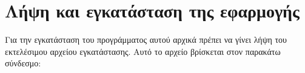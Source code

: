 







\section{Λήψη και εγκατάσταση της εφαρμογής}
Για την εγκατάσταση του προγράμματος αυτού αρχικά πρέπει να γίνει λήψη του εκτελέσιμου
αρχείου εγκατάστασης. Αυτό το αρχείο βρίσκεται στον παρακάτω σύνδεσμο:
